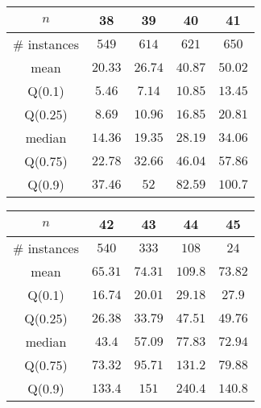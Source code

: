 \begin{tabular}{c|cccc} 
\hline 
$n$ & 38 & 39 & 40 & 41 \tabularnewline 
\hline 
\hline 
\# instances & $549$ & $614$ & $621$ & $650$ \tabularnewline 
mean & $20.33$ & $26.74$ & $40.87$ & $50.02$ \tabularnewline 
Q(0.1) & $5.46$ & $7.14$ & $10.85$ & $13.45$ \tabularnewline 
Q(0.25) & $8.69$ & $10.96$ & $16.85$ & $20.81$ \tabularnewline 
median & $14.36$ & $19.35$ & $28.19$ & $34.06$ \tabularnewline 
Q(0.75) & $22.78$ & $32.66$ & $46.04$ & $57.86$ \tabularnewline 
Q(0.9) & $37.46$ & $52$ & $82.59$ & $100.7$ \tabularnewline 
\hline 
\end{tabular} 
\medskip{} 

\begin{tabular}{c|cccc} 
\hline 
$n$ & 42 & 43 & 44 & 45 \tabularnewline 
\hline 
\hline 
\# instances & $540$ & $333$ & $108$ & $24$ \tabularnewline 
mean & $65.31$ & $74.31$ & $109.8$ & $73.82$ \tabularnewline 
Q(0.1) & $16.74$ & $20.01$ & $29.18$ & $27.9$ \tabularnewline 
Q(0.25) & $26.38$ & $33.79$ & $47.51$ & $49.76$ \tabularnewline 
median & $43.4$ & $57.09$ & $77.83$ & $72.94$ \tabularnewline 
Q(0.75) & $73.32$ & $95.71$ & $131.2$ & $79.88$ \tabularnewline 
Q(0.9) & $133.4$ & $151$ & $240.4$ & $140.8$ \tabularnewline 
\hline 
\end{tabular} 
\medskip{} 

